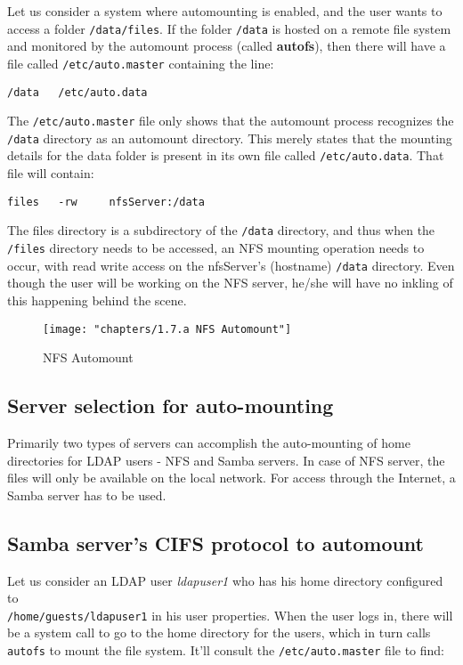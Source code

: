 Let us consider a system where automounting is enabled, and the user wants to access a folder \verb|/data/files|. If the folder \verb|/data| is hosted on a remote file system and monitored by the automount process (called \textbf{autofs}), then there will have a file called \verb|/etc/auto.master| containing the line:

\begin{verbatim}
/data	/etc/auto.data
\end{verbatim}

The \verb|/etc/auto.master| file only shows that the automount process recognizes the \verb|/data| directory as an automount directory. This merely states that the mounting details for the data folder is present in its own file called \verb|/etc/auto.data|. That file will contain:

\begin{verbatim}
files	-rw		nfsServer:/data
\end{verbatim}

The files directory is a subdirectory of the \verb|/data| directory, and thus when the \verb|/files| directory needs to be accessed, an NFS mounting operation needs to occur, with read write access on the nfsServer's (hostname) \verb|/data| directory. Even though the user will be working on the NFS server, he/she will have no inkling of this happening behind the scene. 

\begin{figure}[H]
	\centering
	\texttt{[image: "chapters/1.7.a NFS Automount"]}
	\caption{NFS Automount}
	\label{fig:1}
\end{figure}


\subsection{Server selection for auto-mounting}
Primarily two types of servers can accomplish the auto-mounting of home directories for LDAP users - NFS and Samba servers. In case of NFS server, the files will only be available on the local network. For access through the Internet, a Samba server has to be used. 

\subsection{Samba server's CIFS protocol to automount}
Let us consider an LDAP user \textit{ldapuser1} who has his home directory configured to \\\verb|/home/guests/ldapuser1| in his user properties. When the user logs in, there will be a system call to go to the home directory for the users, which in turn calls \verb|autofs| to mount the file system. It'll consult the \verb|/etc/auto.master| file to find:

